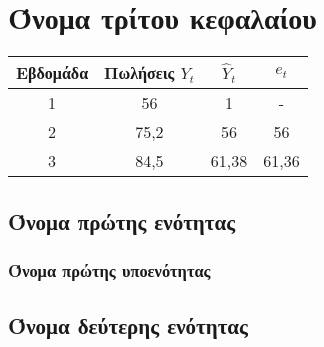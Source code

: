 
\chapter{Όνομα τρίτου κεφαλαίου}
\begin{table}
\begin{tabular}{| c | c | c | c |}
\hline Εβδομάδα  & Πωλήσεις $Y_t$ &  $ \widehat{Y}_t $  & $ e_t $  \\
\hline 1 & 56 & 1 & -\\
\hline 2 & 75,2 & 56 & 56 \\
\hline 3 & 84,5 & 61,38 & 61,36\\
\hline

\end{tabular}
\end{table}

\section{Όνομα πρώτης ενότητας}

\subsection{Όνομα πρώτης υποενότητας}


\section{Όνομα δεύτερης ενότητας}








\endinput
